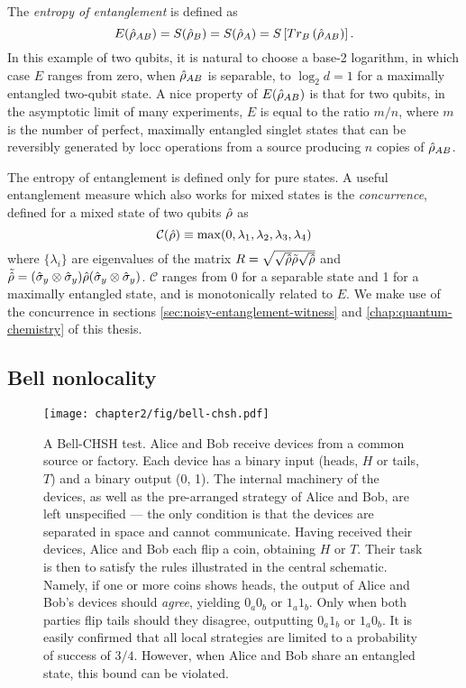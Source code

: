 The \emph{entropy of entanglement} is defined \cite{Bennett1996} as 
\begin{equation}
E(\hat{\rho}_{AB}) = S(\hat{\rho}_B) = S(\hat{\rho}_A) = S\left[Tr_B \left( \hat{\rho}_{AB} \right) \right].
\label{eqn:entropy-of-entanglement}
\end{equation}
In this example of two qubits, it is natural to choose a base-2 logarithm, in which case $E$ ranges from zero, when $\hat{\rho}_{AB}$ is separable, to $\log_2 d = 1$ for a maximally entangled two-qubit state.  A nice property of $E(\hat{\rho}_{AB})$ is that for two qubits, in the asymptotic limit of many experiments, $E$ is equal to the ratio $m/n$, where $m$ is the number of perfect, maximally entangled singlet states that can be reversibly generated by \gls{locc} operations from a source producing $n$ copies of $\hat{\rho}_{AB}$.

The entropy of entanglement is defined only for pure states. A useful entanglement measure which also works for mixed states is the \emph{concurrence}, defined for a mixed state of two qubits $\hat{\rho}$ as
\begin{equation}
\mathcal{C}(\hat{\rho}) \equiv \max(0, \lambda_1, \lambda_2, \lambda_3, \lambda_4)
\label{eqn:concurrence}
\end{equation}
where $\{\lambda_i\}$ are eigenvalues of the matrix $R=\sqrt{\sqrt{\hat{\rho}} \tilde{\rho} \sqrt{\hat{\rho}}}$ and $\tilde{\hat{\rho}} = (\hat{\sigma}_y \otimes \hat{\sigma}_y) \hat{\rho} (\hat{\sigma}_y \otimes \hat{\sigma}_y)$. $\mathcal{C}$ ranges from 0 for a separable state and 1 for a maximally entangled state, and is monotonically related to $E$. We make use of the concurrence in sections \ref{sec:noisy-entanglement-witness} and \ref{chap:quantum-chemistry} of this thesis.

\subsection{Bell nonlocality}
\label{sec:nonlocality}

\begin{figure}[t!]
\centering
\texttt{[image: chapter2/fig/bell-chsh.pdf]}
\caption[A Bell-CHSH test]{ 
    A Bell-CHSH test. Alice and Bob receive devices from a common source or factory. Each device has a binary input (heads, $H$ or tails, $T$) and a binary output (0, 1). The internal machinery of the devices, as well as the pre-arranged strategy of Alice and Bob, are left unspecified --- the only condition is that the devices are separated in space and cannot communicate. Having received their devices, Alice and Bob each flip a coin, obtaining $H$ or $T$.  Their task is then to satisfy the rules illustrated in the central schematic. Namely, if one or more coins shows heads, the output of Alice and Bob's devices should \emph{agree}, yielding $0_a0_b$ or $1_a1_b$. Only when both parties flip tails should they disagree, outputting $0_a1_b$ or $1_a0_b$. It is easily confirmed that all local strategies are limited to a probability of success of $3/4$. However, when Alice and Bob share an entangled state, this bound can be violated.
}
\label{fig:bell-chsh-test}
\end{figure}


